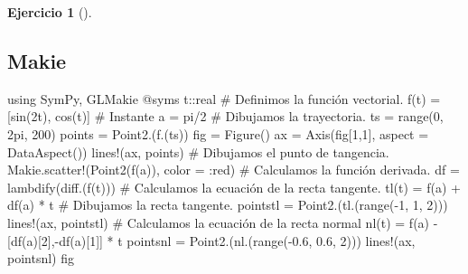 \documentclass[
  a4paper,
]{scrreport}
\newenvironment{Shaded}{\begin{snugshade}}{\end{snugshade}}
\newcommand{\BuiltInTok}[1]{\textcolor[rgb]{0.00,0.23,0.31}{#1}}
\newcommand{\CommentTok}[1]{\textcolor[rgb]{0.37,0.37,0.37}{#1}}
\newcommand{\ConstantTok}[1]{\textcolor[rgb]{0.56,0.35,0.01}{#1}}
\newcommand{\DataTypeTok}[1]{\textcolor[rgb]{0.68,0.00,0.00}{#1}}
\newcommand{\FloatTok}[1]{\textcolor[rgb]{0.68,0.00,0.00}{#1}}
\newcommand{\FunctionTok}[1]{\textcolor[rgb]{0.28,0.35,0.67}{#1}}
\newcommand{\ImportTok}[1]{\textcolor[rgb]{0.00,0.46,0.62}{#1}}
\newcommand{\NormalTok}[1]{\textcolor[rgb]{0.00,0.23,0.31}{#1}}
\newcommand{\OperatorTok}[1]{\textcolor[rgb]{0.37,0.37,0.37}{#1}}
\newcommand{\PreprocessorTok}[1]{\textcolor[rgb]{0.68,0.00,0.00}{#1}}
\theoremstyle{definition}
\newtheorem{exercise}{Ejercicio}[chapter]
\theoremstyle{remark}
\begin{document}
\begin{exercise}[]
\begin{enumerate}
\begin{tcolorbox}
  \section{Makie}

\begin{Shaded}
\begin{Highlighting}[]
\ImportTok{using} \BuiltInTok{SymPy}\NormalTok{, }\BuiltInTok{GLMakie}
\PreprocessorTok{@syms}\NormalTok{ t}\OperatorTok{::}\DataTypeTok{real}
\CommentTok{\# Definimos la función vectorial.}
\FunctionTok{f}\NormalTok{(t) }\OperatorTok{=}\NormalTok{ [}\FunctionTok{sin}\NormalTok{(}\FloatTok{2}\NormalTok{t), }\FunctionTok{cos}\NormalTok{(t)]}
\CommentTok{\# Instante}
\NormalTok{a }\OperatorTok{=} \ConstantTok{pi}\OperatorTok{/}\FloatTok{2}
\CommentTok{\# Dibujamos la trayectoria.}
\NormalTok{ts }\OperatorTok{=} \FunctionTok{range}\NormalTok{(}\FloatTok{0}\NormalTok{, }\FloatTok{2}\NormalTok{pi, }\FloatTok{200}\NormalTok{)}
\NormalTok{points }\OperatorTok{=} \FunctionTok{Point2}\NormalTok{.(}\FunctionTok{f}\NormalTok{.(ts))}
\NormalTok{fig }\OperatorTok{=} \FunctionTok{Figure}\NormalTok{()}
\NormalTok{ax }\OperatorTok{=} \FunctionTok{Axis}\NormalTok{(fig[}\FloatTok{1}\NormalTok{,}\FloatTok{1}\NormalTok{], aspect }\OperatorTok{=} \FunctionTok{DataAspect}\NormalTok{())}
\FunctionTok{lines!}\NormalTok{(ax, points)}
\CommentTok{\# Dibujamos el punto de tangencia.}
\NormalTok{Makie.}\FunctionTok{scatter!}\NormalTok{(}\FunctionTok{Point2}\NormalTok{(}\FunctionTok{f}\NormalTok{(a)), color }\OperatorTok{=} \OperatorTok{:}\NormalTok{red)}
\CommentTok{\# Calculamos la función derivada.}
\NormalTok{df }\OperatorTok{=} \FunctionTok{lambdify}\NormalTok{(}\FunctionTok{diff}\NormalTok{.(}\FunctionTok{f}\NormalTok{(t)))}
\CommentTok{\# Calculamos la ecuación de la recta tangente.}
\FunctionTok{tl}\NormalTok{(t) }\OperatorTok{=} \FunctionTok{f}\NormalTok{(a) }\OperatorTok{+} \FunctionTok{df}\NormalTok{(a) }\OperatorTok{*}\NormalTok{ t}
\CommentTok{\# Dibujamos la recta tangente.}
\NormalTok{pointstl }\OperatorTok{=} \FunctionTok{Point2}\NormalTok{.(}\FunctionTok{tl}\NormalTok{.(}\FunctionTok{range}\NormalTok{(}\OperatorTok{{-}}\FloatTok{1}\NormalTok{, }\FloatTok{1}\NormalTok{, }\FloatTok{2}\NormalTok{)))}
\FunctionTok{lines!}\NormalTok{(ax, pointstl)    }
\CommentTok{\# Calculamos la ecuación de la recta normal}
\FunctionTok{nl}\NormalTok{(t) }\OperatorTok{=} \FunctionTok{f}\NormalTok{(a) }\OperatorTok{{-}}\NormalTok{ [}\FunctionTok{df}\NormalTok{(a)[}\FloatTok{2}\NormalTok{],}\FunctionTok{{-}df}\NormalTok{(a)[}\FloatTok{1}\NormalTok{]] }\OperatorTok{*}\NormalTok{ t}
\NormalTok{pointsnl }\OperatorTok{=} \FunctionTok{Point2}\NormalTok{.(}\FunctionTok{nl}\NormalTok{.(}\FunctionTok{range}\NormalTok{(}\OperatorTok{{-}}\FloatTok{0.6}\NormalTok{, }\FloatTok{0.6}\NormalTok{, }\FloatTok{2}\NormalTok{)))}
\FunctionTok{lines!}\NormalTok{(ax, pointsnl)}
\NormalTok{fig}
\end{Highlighting}
\end{Shaded}


\end{tcolorbox}
\end{enumerate}
\end{exercise}
\end{document}
